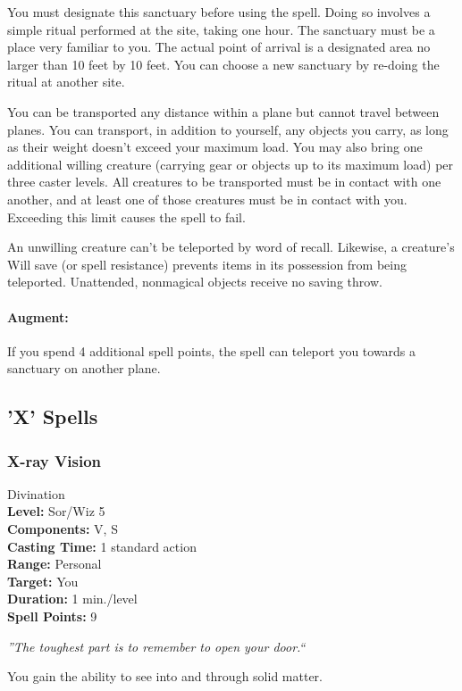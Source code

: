 You must designate this sanctuary before using the spell.
Doing so involves a simple ritual performed at the site, taking one hour. 
The sanctuary must be a place very familiar to you. 
The actual point of arrival is a designated area no larger than 10 feet by 10 feet.
You can choose a new sanctuary by re-doing the ritual at another site.

You can be transported any distance within a plane but cannot travel between planes. 
You can transport, in addition to yourself, any objects you carry, as long as their weight doesn't exceed your maximum load. 
You may also bring one additional willing creature (carrying gear or objects up to its maximum load) per three caster levels. 
All creatures to be transported must be in contact with one another, and at least one of those creatures must be in contact with you. Exceeding this limit causes the spell to fail.

An unwilling creature can't be teleported by word of recall. Likewise, a creature's Will save (or spell resistance) prevents items in its possession from being teleported. Unattended, nonmagical objects receive no saving throw.

\paragraph{Augment:} If you spend 4 additional spell points, the spell can teleport you towards a sanctuary on another plane.
\subsection{'X' Spells}
\subsubsection{X-ray Vision}
\label{Spell:XRayVision}
Divination
\\ \textbf{Level:} Sor/Wiz 5
\\ \textbf{Components:} V, S
\\ \textbf{Casting Time:}  1 standard action
\\ \textbf{Range:} Personal
\\ \textbf{Target:} You
\\ \textbf{Duration:} 1 min./level
\\ \textbf{Spell Points:} 9

\emph{''The toughest part is to remember to open your door.``}

You gain the ability to see into and through solid matter.

